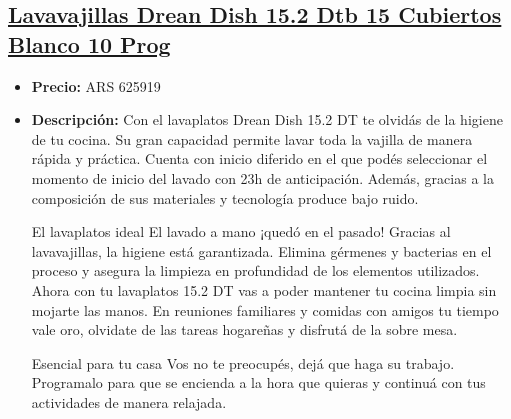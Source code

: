 \documentclass{article}
\begin{document}
\begin{adjustwidth}{2em}{}

\subsection{\uline{\href{https://www.mercadolibre.com.ar/lavavajillas-drean-dish-152-dtb-15-cubiertos-blanco-10-prog/p/MLA12211360}{Lavavajillas Drean Dish 15.2 Dtb 15 Cubiertos Blanco 10 Prog}}}
\begin{itemize}
    \item \textbf{Precio:} ARS 625919
    \item \textbf{Descripción:} Con el lavaplatos Drean Dish 15.2 DT te olvidás de la higiene de tu cocina. Su gran capacidad permite lavar toda la vajilla de manera rápida y práctica. Cuenta con inicio diferido en el que podés seleccionar el momento de inicio del lavado con 23h de anticipación. Además, gracias a la composición de sus materiales y tecnología produce bajo ruido.

El lavaplatos ideal
El lavado a mano ¡quedó en el pasado! Gracias al lavavajillas,  la higiene está garantizada. Elimina gérmenes y bacterias en el proceso y asegura la limpieza en profundidad de los elementos utilizados. Ahora con tu lavaplatos 15.2 DT vas a poder mantener tu cocina limpia sin mojarte las manos. En reuniones familiares y comidas con amigos tu tiempo vale oro, olvidate de las tareas hogareñas y disfrutá de la sobre mesa.

Esencial para tu casa
Vos no te preocupés, dejá que haga su trabajo. Programalo para que se encienda a la hora que quieras y continuá con tus actividades de manera relajada.


\end{itemize}
\end{adjustwidth}
\end{document}
